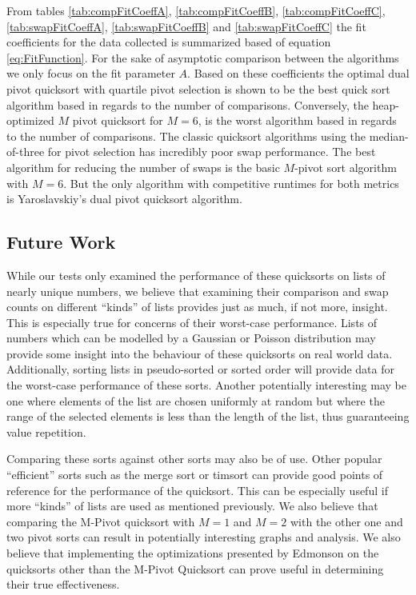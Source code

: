 		From tables \ref{tab:compFitCoeffA}, \ref{tab:compFitCoeffB}, \ref{tab:compFitCoeffC}, \ref{tab:swapFitCoeffA}, \ref{tab:swapFitCoeffB} and \ref{tab:swapFitCoeffC} the fit coefficients for the data collected is summarized based of equation \ref{eq:FitFunction}. For the sake of asymptotic comparison between the algorithms we only focus on the fit parameter $A$. Based on these coefficients the optimal dual pivot quicksort with quartile pivot selection is shown to be the best quick sort algorithm based in regards to the number of comparisons. Conversely, the heap-optimized $M$ pivot quicksort for $M=6$, is the worst algorithm based in regards to the number of comparisons. The classic quicksort algorithms using the median-of-three for pivot selection has incredibly poor swap performance. The best algorithm for reducing the number of swaps is the basic $M$-pivot sort algorithm with $M=6$. But the only algorithm with competitive runtimes for both metrics is Yaroslavskiy's dual pivot quicksort algorithm.
		

	\subsection{Future Work}
		\label{subsec:FutureStuff}
		While our tests only examined the performance of these quicksorts on lists of nearly unique numbers, we believe that examining their comparison and swap counts on different ``kinds'' of lists provides just as much, if not more, insight. This is especially true for concerns of their worst-case performance. Lists of numbers which can be modelled by a Gaussian or Poisson distribution may provide some insight into the behaviour of these quicksorts on real world data. Additionally, sorting lists in pseudo-sorted or sorted order will provide data for the worst-case performance of these sorts. Another potentially interesting may be one where elements of the list are chosen uniformly at random but where the range of the selected elements is less than the length of the list, thus guaranteeing value repetition. 

		Comparing these sorts against other sorts may also be of use. Other popular ``efficient'' sorts such as the merge sort or timsort can provide good points of reference for the performance of the quicksort. This can be especially useful if more ``kinds'' of lists are used as mentioned previously. We also believe that comparing the M-Pivot quicksort with $M=1$ and $M=2$ with the other one and two pivot sorts can result in potentially interesting graphs and analysis. We also believe that implementing the optimizations presented by Edmonson \cite{edmondson2005m} on the quicksorts other than the M-Pivot Quicksort can prove useful in determining their true effectiveness.


